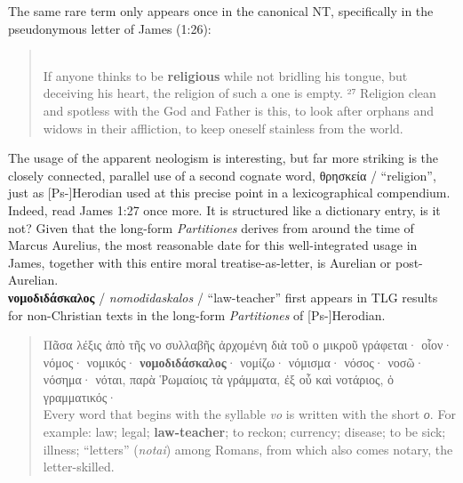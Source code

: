 The same rare term only appears once in the canonical NT, %
specifically in the pseudonymous letter of James (1:26): %

\vspace*{3mm} 
 \begin{quote} \\[1mm] %
 If anyone thinks to be \textbf{religious} %
 while not bridling his tongue, but deceiving his heart, %
 the religion of such a one is empty. %
 ²⁷ Religion clean and spotless with the God and Father is this, %
 to look after orphans and widows in their affliction, %
 to keep oneself stainless from the world. %
 \end{quote} %
 \vspace*{3mm}

\noindent{}The usage of the apparent neologism is interesting, %
but far more striking is the closely connected, %
parallel use of a second cognate word, θρησκεία / “religion”, %
just as [Ps-]Herodian used at this precise point in a lexicographical compendium. %
Indeed, read James 1:27 once more. %
It is structured like a dictionary entry, is it not? %
Given that the long-form \textit{Partitiones} derives from around the %
time of Marcus Aurelius, %
the most reasonable date for this well-integrated usage in James, %
together with this entire moral treatise-as-letter, %
is Aurelian or post-Aurelian. \\[2mm] %

\noindent{}\textbf{νομοδιδάσκαλος} / \textit{nomodidaskalos} / “law-teacher” first appears in TLG results %
for non-Christian texts in the long-form \textit{Partitiones} of [Ps-]Herodian. %

\vspace*{3mm} 
 \begin{quote}Πᾶσα λέξις ἀπὸ τῆς νο συλλαβῆς ἀρχομένη διὰ τοῦ %
 ο μικροῦ γράφεται· οἷον· νόμος· νομικός· \textbf{νομοδιδάσκαλος}· %
 νομίζω· νόμισμα· νόσος· νοσῶ· νόσημα· νόται, %
 παρὰ Ῥωμαίοις τὰ γράμματα, ἐξ οὗ καὶ νοτάριος, ὁ γραμματικός· \\[1mm] %
 Every word that begins with the syllable \textit{vo} is written with the short \textit{ο}. %
 For example: law; legal; \textbf{law-teacher}; to reckon; currency; %
 disease; to be sick; illness; “letters” (\textit{notai}) among Romans, %
 from which also comes notary, the letter-skilled. \end{quote} %
 \clearpage

